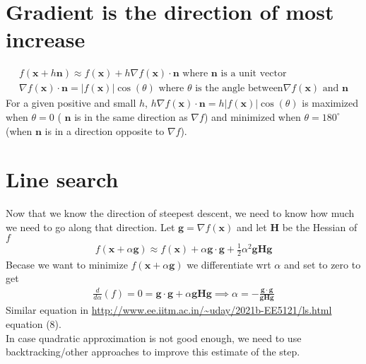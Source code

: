 \documentclass{article}
\newcommand{\ber}{\begin{eqnarray}}
\newcommand{\eer}{\end{eqnarray}}
\newcommand{\dd}[2]{\frac{d}{d{#2}}{(#1)} }
\begin{document}
\section{Gradient is the direction of most increase}
\ber
f(\pmb{x} + h\pmb{n}) \approx f(\pmb{x}) + h\nabla{f(\pmb{x})}\cdot\pmb{n} \text{ where } \pmb{n} \text{ is a unit vector} \\
\nabla{f(\pmb{x})}\cdot\pmb{n} = |f(\pmb{x})|\cos(\theta) \text{ where } \theta \text{ is the angle between} \nabla{}f(\pmb{x}) \text{ and } \pmb{n} 
\eer
For a given positive and small $h$, $h\nabla{f(\pmb{x})}\cdot\pmb{n} = h|f(\pmb{x})|\cos(\theta) $ is maximized when $\theta=0$ ( $\pmb{n}$ is in the same direction as $\nabla{f}$) and minimized when $\theta=180^{\circ}$ (when $\pmb{n}$ is in a direction opposite to $\nabla{}f$). 
\section{Line search}
Now that we know the direction of steepest descent, we need to know how much we need to go along that direction. Let $\pmb{g}=\nabla{}f(\pmb{x})$ and let $\pmb{H}$ be the Hessian of $f$
\ber
f(\pmb{x} + \alpha\pmb{g}) \approx f(\pmb{x}) + \alpha\pmb{g}\cdot\pmb{g} + \frac{1}{2}\alpha^2\pmb{g}\pmb{H}\pmb{g}
\eer
Becase we want to minimize $f(\pmb{x} + \alpha\pmb{g})$ we differentiate wrt $\alpha$ and set to zero to get
\ber
\dd{f}{\alpha} = 0 = \pmb{g}\cdot\pmb{g} + \alpha\pmb{g}\pmb{H}\pmb{g} \implies \alpha = -\frac{\pmb{g}\cdot\pmb{g}}{\pmb{g}\pmb{H}\pmb{g}}
\eer
Similar equation in \url{http://www.ee.iitm.ac.in/~uday/2021b-EE5121/ls.html} equation (8). \\
In case quadratic approximation is not good enough, we need to use backtracking/other approaches to improve this estimate of the step.
\end{document}
